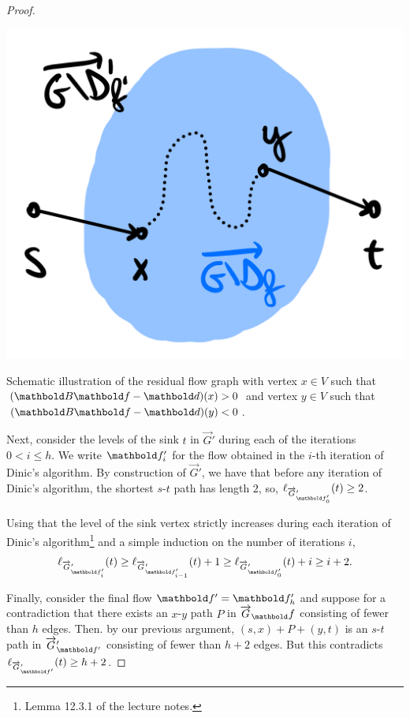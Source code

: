 \documentclass{tufte-handout}
\newcommand{\flowgraph}{\overrightarrow{G}}
\newcommand{\altflowgraph}{\flowgraph'}
\newcommand{\resflowgraph}{\flowgraph_\vf}
\newcommand{\altresflowgraph}{\altflowgraph_{\vf'}}
\begin{document}
\begin{proof}
\begin{marginfigure}[7\baselineskip]
\includegraphics[width=\textwidth]{assignments/figures/resflowgraph.png}
\caption{Schematic illustration of the residual flow graph with vertex $x \in V$ such that $(\mB\vf - \vd)(x) > 0$ and vertex $y \in V$ such that $(\mB\vf - \vd)(y) < 0$.}\label{fig:1:A:1:1}
\end{marginfigure}

Next, consider the levels of the sink $t$ in $\altflowgraph$ during each of the iterations $0 < i \leq h$. We write $\vf_i'$ for the flow obtained in the $i$-th iteration of Dinic's algorithm. By construction of $\altflowgraph$, we have that before any iteration of Dinic's algorithm, the shortest $s$-$t$ path has length $2$, so, $\ell_{\altflowgraph_{\vf_0'}}(t) \geq 2$.

Using that the level of the sink vertex strictly increases during each iteration of Dinic's algorithm\footnote{Lemma 12.3.1 of the lecture notes.} and a simple induction on the number of iterations $i$, \begin{align*}
    \ell_{\altflowgraph_{\vf_i'}}(t) \geq \ell_{\altflowgraph_{\vf_{i-1}'}}(t) + 1 \geq \ell_{\altflowgraph_{\vf_0'}}(t) + i \geq i + 2.
\end{align*}

Finally, consider the final flow $\vf' = \vf_h'$ and suppose for a contradiction that there exists an $x$-$y$ path $P$ in $\resflowgraph$ consisting of fewer than $h$ edges. Then. by our previous argument, $(s,x) + P + (y,t)$ is an $s$-$t$ path in $\altresflowgraph$ consisting of fewer than $h + 2$ edges. But this contradicts $\ell_{\altflowgraph_{\vf'}}(t) \geq h + 2$.
\end{proof}
\end{document}
